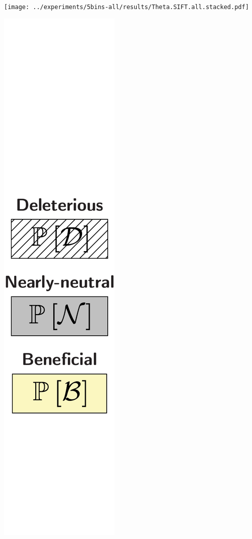 \documentclass{article}
\begin{document}
    \begin{center}
        \begin{minipage}{0.9\linewidth}
            \texttt{[image: ../experiments/5bins-all/results/Theta.SIFT.all.stacked.pdf]}
        \end{minipage}
        \begin{minipage}{0.09\linewidth}
            \includegraphics[width=\linewidth, page=1]{artworks/legend.polycat}

\end{minipage}
\end{center}
\end{document}
